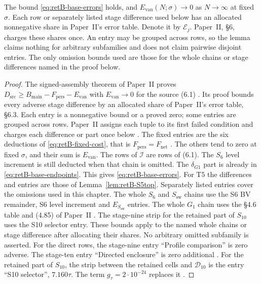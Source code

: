 \begin{lemma}\label{lem:retB-base-errors}
The bound \eqref{eq:retB-base-errors} holds, and $E_{\mathrm{van}}(N;\sigma)\to0$
as $N\to\infty$ at fixed $\sigma$. Each row or separately listed stage
difference used below has an allocated nonnegative share in Paper~II's
error table. Denote it by $\mathcal E_j$. Paper~II, \S6, charges these shares once.
An entry may be grouped across rows, so the lemma claims nothing for
arbitrary subfamilies and does not claim pairwise disjoint entries. The only
omission bounds used are those for the whole chains or stage differences
named in the proof below.
\end{lemma}

\begin{proof}
The signed-assembly theorem of Paper~II proves
$D_{\mathrm{src}}\ge B_{\mathrm{main}}-F_{\mathrm{pers}}-E_{\mathrm{van}}$
with $E_{\mathrm{van}}\to0$ for the source (6.1)
\cite[\S6.1, (6.1)--(6.2), (6.4)--(6.4d)]{PaperII}. Its proof bounds every
adverse stage difference by an allocated share of Paper~II's error table,
\S6.3. Each entry is a nonnegative bound or a proved zero; some entries are
grouped across rows. Paper~II assigns each tuple to its first failed
condition and charges each difference or part once below
\cite[\S6.3]{PaperII}. The fixed entries are the six deductions of
\eqref{eq:retB-fixed-cost}, that is $F_{\mathrm{pers}}=F_{\mathrm{net}}$
\cite[(6.6)]{PaperII}. The others tend to zero at fixed $\sigma$, and their
sum is $E_{\mathrm{van}}$. The rows of $\mathcal I$ are rows of (6.1).
The $S_6$ level increment is still deducted when that chain is omitted.
The $\delta_{G1}$ part is already
in \eqref{eq:retB-base-endpoints}. This gives \eqref{eq:retB-base-errors}.
For $\mathrm{T5}$ the differences and entries are those of
Lemma~\ref{lem:retB-S5top}.
Separately listed entries cover the omissions used in this chapter.
The whole $S_6$ and $S_{\mathrm{sw}}$ chains use the S6 BV remainder,
S6 level increment and $E_{S_{\mathrm{sw}}}$ entries. The whole $G_1$
chain uses the \S4.6 table and (4.85) of Paper~II
\cite[\S4.6, (4.85)]{PaperII}. The stage-nine strip for the retained
part of $S_{10}$ uses the S10 selector entry. These bounds apply
to the named whole chains or stage difference after allocating their shares.
No arbitrary omitted subfamily is asserted. For the direct rows, the stage-nine entry
``Profile comparison'' is zero adverse. The stage-ten entry ``Directed
enclosure'' is zero additional \cite[\S6.3]{PaperII}. For the retained part
of $S_{10}$, the strip between the retained cells and $\mathcal D_{10}$ is the
entry ``S10 selector'', $7.160\tau$. The term $g_\tau=2\cdot10^{-24}$ replaces it
\cite[\S6.3, rows ``S10 selector'' and $g_\tau$]{PaperII}.


\end{proof}
